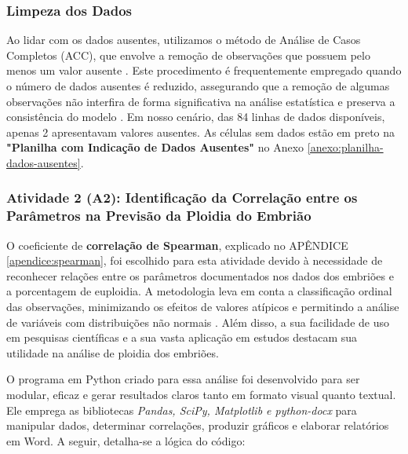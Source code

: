 \subsubsection{Limpeza dos Dados}
Ao lidar com os dados ausentes, utilizamos o método de Análise de Casos Completos (ACC), que envolve a remoção de observações que possuem pelo menos um valor ausente \cite{camargos2011}. Este procedimento é frequentemente empregado quando o número de dados ausentes é reduzido, assegurando que a remoção de algumas observações não interfira de forma significativa na análise estatística e preserva a consistência do modelo \cite{camargos2011}. Em nosso cenário, das 84 linhas de dados disponíveis, apenas 2 apresentavam valores ausentes. As células sem dados estão em preto na \textbf{"Planilha com Indicação de Dados Ausentes"} no Anexo \ref{anexo:planilha-dados-ausentes}. 

\subsubsection{Atividade 2 (A2): Identificação da Correlação entre os Parâmetros na Previsão da Ploidia do Embrião}

O coeficiente de \textbf{correlação de Spearman}, explicado no APÊNDICE \ref{apendice:spearman}, foi escolhido para esta atividade devido à necessidade de reconhecer relações entre os parâmetros documentados nos dados dos embriões e a porcentagem de euploidia. A metodologia leva em conta a classificação ordinal das observações, minimizando os efeitos de valores atípicos e permitindo a análise de variáveis com distribuições não normais \cite{sousa2019}. Além disso, a sua facilidade de uso em pesquisas científicas e a sua vasta aplicação em estudos destacam sua utilidade na análise de ploidia dos embriões.

O programa em Python criado para essa análise foi desenvolvido para ser modular, eficaz e gerar resultados claros tanto em formato visual quanto textual. Ele emprega as bibliotecas \textit{Pandas, SciPy, Matplotlib e python-docx} para manipular dados, determinar correlações, produzir gráficos e elaborar relatórios em Word. A seguir, detalha-se a lógica do código:

